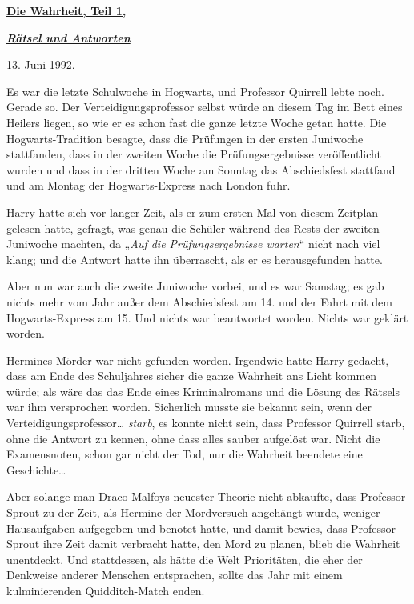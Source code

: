 

\hypertarget{die-wahrheit-teil-1}{%

\textbf{\uline{Die Wahrheit, Teil 1,}}

\textbf{\emph{\uline{Rätsel und Antworten}}}

13. Juni 1992.

Es war die letzte Schulwoche in Hogwarts, und Professor Quirrell lebte noch. Gerade so. Der Verteidigungsprofessor selbst würde an diesem Tag im Bett eines Heilers liegen, so wie er es schon fast die ganze letzte Woche getan hatte. Die Hogwarts-Tradition besagte, dass die Prüfungen in der ersten Juniwoche stattfanden, dass in der zweiten Woche die Prüfungsergebnisse veröffentlicht wurden und dass in der dritten Woche am Sonntag das Abschiedsfest stattfand und am Montag der Hogwarts-Express nach London fuhr.

Harry hatte sich vor langer Zeit, als er zum ersten Mal von diesem Zeitplan gelesen hatte, gefragt, was genau die Schüler während des Rests der zweiten Juniwoche machten, da „\emph{Auf die Prüfungsergebnisse warten}“ nicht nach viel klang; und die Antwort hatte ihn überrascht, als er es herausgefunden hatte.

Aber nun war auch die zweite Juniwoche vorbei, und es war Samstag; es gab nichts mehr vom Jahr außer dem Abschiedsfest am 14. und der Fahrt mit dem Hogwarts-Express am 15. Und nichts war beantwortet worden. Nichts war geklärt worden.

Hermines Mörder war nicht gefunden worden. Irgendwie hatte Harry gedacht, dass am Ende des Schuljahres sicher die ganze Wahrheit ans Licht kommen würde; als wäre das das Ende eines Kriminalromans und die Lösung des Rätsels war ihm versprochen worden. Sicherlich musste sie bekannt sein, wenn der Verteidigungsprofessor… \emph{starb}, es konnte nicht sein, dass Professor Quirrell starb, ohne die Antwort zu kennen, ohne dass alles sauber aufgelöst war. Nicht die Examensnoten, schon gar nicht der Tod, nur die Wahrheit beendete eine Geschichte…

Aber solange man Draco Malfoys neuester Theorie nicht abkaufte, dass Professor Sprout zu der Zeit, als Hermine der Mordversuch angehängt wurde, weniger Hausaufgaben aufgegeben und benotet hatte, und damit bewies, dass Professor Sprout ihre Zeit damit verbracht hatte, den Mord zu planen, blieb die Wahrheit unentdeckt. Und stattdessen, als hätte die Welt Prioritäten, die eher der Denkweise anderer Menschen entsprachen, sollte das Jahr mit einem kulminierenden Quidditch-Match enden.

}
